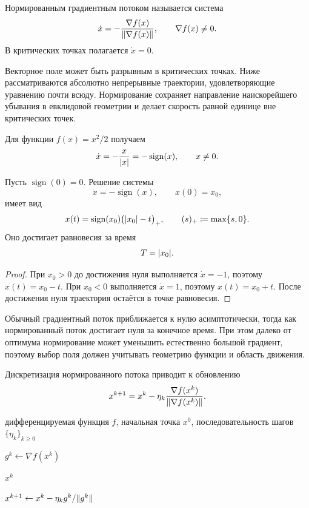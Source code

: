 \begin{definition}
Нормированным градиентным потоком называется система
\[
    \dot{x}
    =
    -
    \frac{\nabla f(x)}
         {\lVert\nabla f(x)\rVert},
    \qquad
    \nabla f(x)\ne0.
\]
В критических точках полагается \(\dot{x}=0\).
\end{definition}

Векторное поле может быть разрывным в критических точках. Ниже
рассматриваются абсолютно непрерывные траектории, удовлетворяющие
уравнению почти всюду. Нормирование сохраняет направление
наискорейшего убывания в евклидовой геометрии и делает скорость равной
единице вне критических точек.

Для функции \(f(x)=x^2/2\) получаем
\[
    \dot{x}
    =
    -\frac{x}{\lvert x\rvert}
    =
    -\operatorname{sign}(x),
    \qquad x\ne0.
\]

\begin{lemma}
Пусть \(\operatorname{sign}(0)=0\). Решение системы
\[
    \dot{x}=-\operatorname{sign}(x),
    \qquad
    x(0)=x_0,
\]
имеет вид
\[
    x(t)
    =
    \operatorname{sign}(x_0)\bigl(\lvert x_0\rvert-t\bigr)_+,
    \qquad
    (s)_+\coloneqq\max\{s,0\}.
\]
Оно достигает равновесия за время
\[
    T=\lvert x_0\rvert.
\]
\end{lemma}

\begin{proof}
При \(x_0>0\) до достижения нуля выполняется \(\dot{x}=-1\), поэтому
\(x(t)=x_0-t\). При \(x_0<0\) выполняется \(\dot{x}=1\), поэтому
\(x(t)=x_0+t\). После достижения нуля траектория остаётся в точке
равновесия.
\end{proof}

Обычный градиентный поток приближается к нулю асимптотически, тогда
как нормированный поток достигает нуля за конечное время. При этом
далеко от оптимума нормирование может уменьшить естественно большой
градиент, поэтому выбор поля должен учитывать геометрию функции и
область движения.

Дискретизация нормированного потока приводит к обновлению
\[
    x^{k+1}
    =
    x^k
    -
    \eta_k
    \frac{\nabla f(x^k)}
         {\lVert\nabla f(x^k)\rVert}.
\]

\begin{algorithm}[H]
\caption{Нормированный градиентный метод}
\label{alg:normalized-gradient}
\begin{algorithmic}[1]

\Require
дифференцируемая функция \(f\),
начальная точка \(x^0\),
последовательность шагов \(\{\eta_k\}_{k\ge0}\)


    \State
    \(g^k\gets\nabla f(x^k)\)


        \State
        \Return \(x^k\)

    \EndIf

    \State
    \(x^{k+1}
    \gets
    x^k-\eta_k g^k/\lVert g^k\rVert\)

\EndFor

\end{algorithmic}
\end{algorithm}

